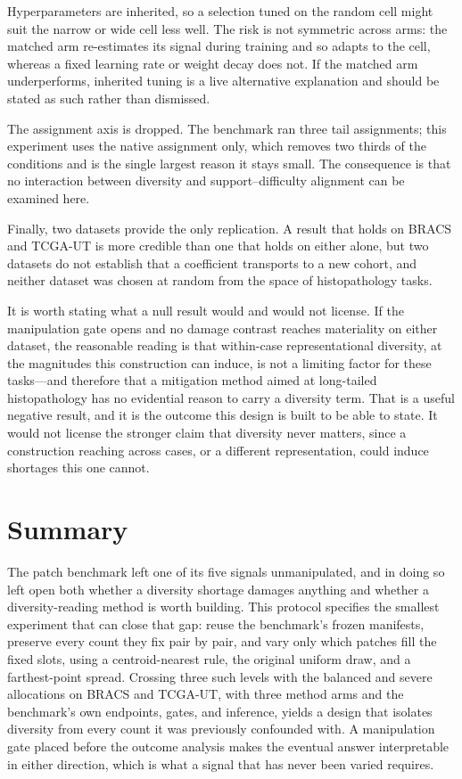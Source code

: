 \documentclass[11pt]{article}
\begin{document}
Hyperparameters are inherited, so a selection tuned on the random cell might suit the narrow or wide cell less well. The risk is not symmetric across arms: the matched arm re-estimates its signal during training and so adapts to the cell, whereas a fixed learning rate or weight decay does not. If the matched arm underperforms, inherited tuning is a live alternative explanation and should be stated as such rather than dismissed.

The assignment axis is dropped. The benchmark ran three tail assignments; this experiment uses the native assignment only, which removes two thirds of the conditions and is the single largest reason it stays small. The consequence is that no interaction between diversity and support--difficulty alignment can be examined here.

Finally, two datasets provide the only replication. A result that holds on BRACS and TCGA-UT is more credible than one that holds on either alone, but two datasets do not establish that a coefficient transports to a new cohort, and neither dataset was chosen at random from the space of histopathology tasks.

It is worth stating what a null result would and would not license. If the manipulation gate opens and no damage contrast reaches materiality on either dataset, the reasonable reading is that within-case representational diversity, at the magnitudes this construction can induce, is not a limiting factor for these tasks---and therefore that a mitigation method aimed at long-tailed histopathology has no evidential reason to carry a diversity term. That is a useful negative result, and it is the outcome this design is built to be able to state. It would not license the stronger claim that diversity never matters, since a construction reaching across cases, or a different representation, could induce shortages this one cannot.

\section{Summary}
\label{sec:summary}
The patch benchmark left one of its five signals unmanipulated, and in doing so left open both whether a diversity shortage damages anything and whether a diversity-reading method is worth building. This protocol specifies the smallest experiment that can close that gap: reuse the benchmark's frozen manifests, preserve every count they fix pair by pair, and vary only which patches fill the fixed slots, using a centroid-nearest rule, the original uniform draw, and a farthest-point spread. Crossing three such levels with the balanced and severe allocations on BRACS and TCGA-UT, with three method arms and the benchmark's own endpoints, gates, and inference, yields a design that isolates diversity from every count it was previously confounded with. A manipulation gate placed before the outcome analysis makes the eventual answer interpretable in either direction, which is what a signal that has never been varied requires.



\end{document}

